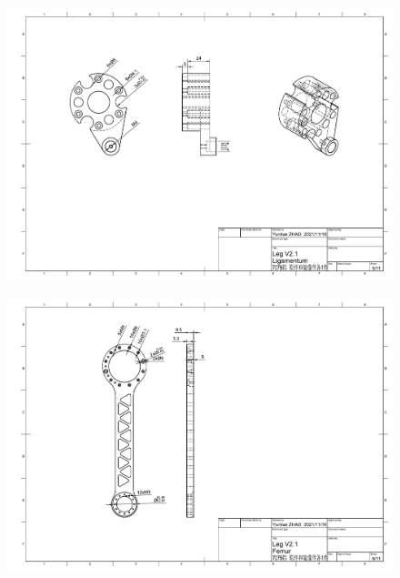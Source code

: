 \begin{figure}
  \centering
  \includegraphics[width=1.4\linewidth, angle=90]{figures/appendix/dwg5.pdf}
   \vspace{6pt}
\end{figure}

\begin{figure}
  \centering
  \includegraphics[width=1.4\linewidth, angle=90]{figures/appendix/dwg6.pdf}
   \vspace{6pt}
\end{figure}

